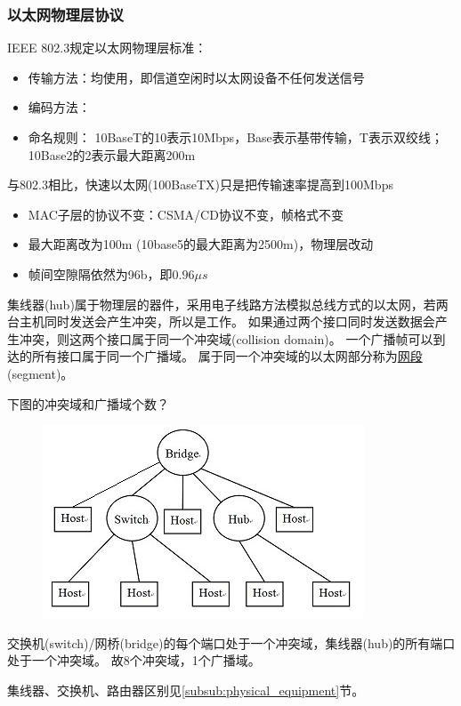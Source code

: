 \subsubsection{以太网物理层协议}
IEEE 802.3规定以太网物理层标准：
\begin{itemize}
	\item 传输方法：均使用，即信道空闲时以太网设备不任何发送信号
	\item 编码方法：
	\item 命名规则： 10BaseT的10表示10Mbps，Base表示基带传输，T表示双绞线；10Base2的2表示最大距离200m
\end{itemize}

与802.3相比，快速以太网(100BaseTX)只是把传输速率提高到100Mbps
\begin{itemize}
	\item MAC子层的协议不变：CSMA/CD协议不变，帧格式不变
	\item 最大距离改为100m (10base5的最大距离为2500m)，物理层改动
	\item 帧间空隙隔依然为96b，即$0.96\mu s$
\end{itemize}

集线器(hub)属于物理层的器件，采用电子线路方法模拟总线方式的以太网，若两台主机同时发送会产生冲突，所以是工作。
如果通过两个接口同时发送数据会产生冲突，则这两个接口属于同一个冲突域(collision domain)。
一个广播帧可以到达的所有接口属于同一个广播域。
属于同一个冲突域的以太网部分称为\underline{网段}(segment)。
\begin{example}
	下图的冲突域和广播域个数？
	\begin{figure}[H]
		\centering
		\includegraphics[width=0.35\linewidth]{fig/conflict_count.jpg}
	\end{figure}
\end{example}
\begin{analysis}
交换机(switch)/网桥(bridge)的每个端口处于一个冲突域，集线器(hub)的所有端口处于一个冲突域。
故8个冲突域，1个广播域。
\end{analysis}

集线器、交换机、路由器区别见\ref{subsub:physical_equipment}节。

